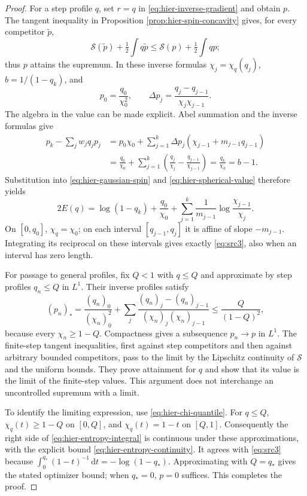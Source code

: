 \documentclass[11pt,a4paper]{article}
\numberwithin{equation}{section}
\theoremstyle{definition}
\theoremstyle{remark}
\newcommand{\dd}{\mathrm d}
\begin{document}
\begin{proof}
For a step profile $q$, set $r=q$ in
\eqref{eq:hier-inverse-gradient} and obtain $p$.
The tangent inequality in Proposition \ref{prop:hier-spin-concavity} gives,
for every competitor $\widetilde p$,
\[
 \mathcal S(\widetilde p)+\tfrac12\int q\widetilde p
 \le\mathcal S(p)+\tfrac12\int qp;
\]
thus $p$ attains the supremum.  In these inverse formulas
$\chi_j=\chi_q(q_j)$, $b=1/(1-q_k)$, and
\[
 p_0=\frac{q_0}{\chi_0^2},\qquad
 \Delta p_j=\frac{q_j-q_{j-1}}{\chi_j\chi_{j-1}}.
\]
The algebra in the value can be made explicit.  Abel summation and the
inverse formulas give
\begin{align*}
 p_k-\sum_jw_jq_jp_j
 &=p_0\chi_0+
   \sum_{j=1}^k\Delta p_j(\chi_{j-1}+m_{j-1}q_{j-1})\\
 &=\frac{q_0}{\chi_0}+
   \sum_{j=1}^k\left(\frac{q_j}{\chi_j}
                         -\frac{q_{j-1}}{\chi_{j-1}}\right)
 =\frac{q_k}{\chi_k}=b-1.
\end{align*}
Substitution into \eqref{eq:hier-gaussian-spin} and
\eqref{eq:hier-spherical-value} therefore yields
\[
 2E(q)=\log(1-q_k)+\frac{q_0}{\chi_0}
       +\sum_{j=1}^k\frac1{m_{j-1}}
                                   \log\frac{\chi_{j-1}}{\chi_j}.
\]
On $[0,q_0]$, $\chi_q=\chi_0$; on each interval
$[q_{j-1},q_j]$ it is affine of slope $-m_{j-1}$.  Integrating its reciprocal
on these intervals gives exactly \eqref{eq:src3}, also when an interval has
zero length.

For passage to general profiles, fix $Q<1$ with $q\le Q$ and approximate
by step profiles $q_n\le Q$ in $L^1$.  Their inverse profiles satisfy
\[
 (p_n)_*=\frac{(q_n)_0}{(\chi_n)_0^2}
   +\sum_j\frac{(q_n)_j-(q_n)_{j-1}}
                   {(\chi_n)_j(\chi_n)_{j-1}}
 \le\frac{Q}{(1-Q)^2},
\]
because every $\chi_n\ge1-Q$.  Compactness gives a subsequence $p_n\to p$
in $L^1$.  The finite-step tangent inequalities, first against step
competitors and then against arbitrary bounded competitors, pass to the
limit by the Lipschitz continuity of $\mathcal S$ and the uniform bounds.
They prove attainment for $q$ and show that its value is the limit of the
finite-step values.  This argument does not interchange an uncontrolled
supremum with a limit.

To identify the limiting expression, use \eqref{eq:hier-chi-quantile}.
For $q\le Q$,
$\chi_q(t)\ge1-Q$ on $[0,Q]$, and $\chi_q(t)=1-t$ on $[Q,1]$.
Consequently the right side of \eqref{eq:hier-entropy-integral} is continuous
under these approximations, with the explicit bound
\eqref{eq:hier-entropy-continuity}.  It agrees with
\eqref{eq:src3} because
$\int_0^{q_*}(1-t)^{-1}\,\dd t=-\log(1-q_*)$.
Approximating with $Q=q_*$ gives the stated optimizer bound; when $q_*=0$,
$p=0$ suffices.  This completes the proof.
\end{proof}
\end{document}
